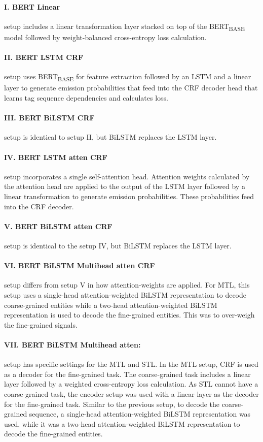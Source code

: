 \documentclass[runningheads]{llncs}
\begin{document}
\paragraph{I. BERT Linear} setup includes a linear transformation layer stacked on top of the BERT\textsubscript{BASE} model followed by weight-balanced cross-entropy loss calculation.

\paragraph{II. BERT LSTM CRF} setup uses BERT\textsubscript{BASE} for feature extraction followed by an LSTM and a linear layer to generate emission probabilities that feed into the CRF decoder head that learns tag sequence dependencies and calculates loss. 

\paragraph{III. BERT BiLSTM CRF} setup is identical to setup II, but BiLSTM replaces the LSTM layer.

\paragraph{IV. BERT LSTM atten CRF} setup incorporates a single self-attention head.
Attention weights calculated by the attention head are applied to the output of the LSTM layer followed by a linear transformation to generate emission probabilities. These probabilities feed into the CRF decoder.

\paragraph{V. BERT BiLSTM atten CRF} setup is identical to the setup IV, but BiLSTM replaces the LSTM layer.

\paragraph{VI. BERT BiLSTM Multihead atten CRF} setup differs from setup V in how attention-weights are applied. For MTL, this setup uses a single-head attention-weighted BiLSTM representation to decode coarse-grained entities while a two-head attention-weighted BiLSTM representation is used to decode the fine-grained entities.
This was to over-weigh the fine-grained signals.

\paragraph{VII. BERT BiLSTM Multihead atten: } setup has specific settings for the MTL and STL. In the MTL setup, CRF is used as a decoder for the fine-grained task.
The coarse-grained task includes a linear layer followed by a weighted cross-entropy loss calculation.
As STL cannot have a coarse-grained task, the encoder setup was used with a linear layer as the decoder for the fine-grained task.
Similar to the previous setup, to decode the coarse-grained sequence, a single-head attention-weighted BiLSTM representation was used, while it was a two-head attention-weighted BiLSTM representation to decode the fine-grained entities.
\end{document}
